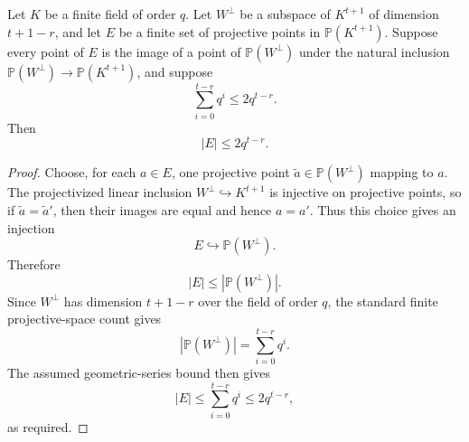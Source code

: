 \begin{helper}
Let \(K\) be a finite field of order \(q\).  Let \(W^\perp\) be a subspace
of \(K^{t+1}\) of dimension \(t+1-r\), and let \(E\) be a finite set of
projective points in \(\mathbb P(K^{t+1})\).  Suppose every point of \(E\)
is the image of a point of \(\mathbb P(W^\perp)\) under the natural inclusion
\(\mathbb P(W^\perp)\to\mathbb P(K^{t+1})\), and suppose
\[
  \sum_{i=0}^{t-r} q^i\le 2q^{t-r}.
\]
Then
\[
  |E|\le 2q^{t-r}.
\]
\end{helper}
\begin{proof}
Choose, for each \(a\in E\), one projective point
\(\widetilde a\in\mathbb P(W^\perp)\) mapping to \(a\).  The projectivized
linear inclusion \(W^\perp\hookrightarrow K^{t+1}\) is injective on
projective points, so if \(\widetilde a=\widetilde a'\), then their images
are equal and hence \(a=a'\).  Thus this choice gives an injection
\[
  E\hookrightarrow \mathbb P(W^\perp).
\]
Therefore
\[
  |E|\le |\mathbb P(W^\perp)|.
\]
Since \(W^\perp\) has dimension \(t+1-r\) over the field of order \(q\), the
standard finite projective-space count gives
\[
  |\mathbb P(W^\perp)|=\sum_{i=0}^{t-r}q^i.
\]
The assumed geometric-series bound then gives
\[
  |E|\le \sum_{i=0}^{t-r}q^i\le 2q^{t-r},
\]
as required.
\end{proof}
